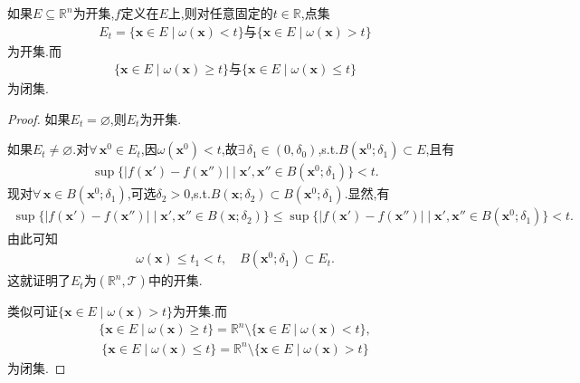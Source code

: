 \documentclass[../../main.tex]{subfiles}%
\begin{document}
\begin{theorem}\label{theorem:振幅函数的定义和性质}
如果$E\subseteq\mathbb{R}^n$为开集,$f$定义在$E$上,则对任意固定的$t\in\mathbb{R}$,点集
\begin{align*}
E_t=\{\boldsymbol{x}\in E\mid \omega(\boldsymbol{x})<t\}\text{与}\{\boldsymbol{x}\in E\mid \omega(\boldsymbol{x})>t\}
\end{align*}
为开集.而
\begin{align*}
\{\boldsymbol{x}\in E\mid \omega(\boldsymbol{x})\geqslant t\}\text{与}\{\boldsymbol{x}\in E\mid \omega(\boldsymbol{x})\leqslant t\}
\end{align*}
为闭集.
\end{theorem}
\begin{proof}

如果$E_t=\varnothing$,则$E_t$为开集.

如果$E_t\neq\varnothing$.对$\forall\,\boldsymbol{x}^0\in E_t$,因$\omega(\boldsymbol{x}^0)<t$,故$\exists\,\delta_1\in(0,\delta_0)$,s.t.$B(\boldsymbol{x}^0;\delta_1)\subset E$,且有
\begin{align*}
\sup\{|f(\boldsymbol{x}')-f(\boldsymbol{x}'')|\mid \boldsymbol{x}',\boldsymbol{x}''\in B(\boldsymbol{x}^0;\delta_1)\}<t.
\end{align*}
现对$\forall\,\boldsymbol{x}\in B(\boldsymbol{x}^0;\delta_1)$,可选$\delta_2>0$,s.t.$B(\boldsymbol{x};\delta_2)\subset B(\boldsymbol{x}^0;\delta_1)$.显然,有
\begin{align*}
\sup\{|f(\boldsymbol{x}')-f(\boldsymbol{x}'')|\mid \boldsymbol{x}',\boldsymbol{x}''\in B(\boldsymbol{x};\delta_2)\}\leqslant \sup\{|f(\boldsymbol{x}')-f(\boldsymbol{x}'')|\mid \boldsymbol{x}',\boldsymbol{x}''\in B(\boldsymbol{x}^0;\delta_1)\}<t.
\end{align*}
由此可知
\begin{align*}
\omega(\boldsymbol{x})\leqslant t_1<t,\quad B(\boldsymbol{x}^0;\delta_1)\subset E_t.
\end{align*}
这就证明了$E_t$为$(\mathbb{R}^n,\mathscr{T})$中的开集.

类似可证$\{\boldsymbol{x}\in E\mid \omega(\boldsymbol{x})>t\}$为开集.而
\begin{align*}
\{\boldsymbol{x}\in E\mid \omega(\boldsymbol{x})\geqslant t\}=\mathbb{R}^n\setminus\{\boldsymbol{x}\in E\mid \omega(\boldsymbol{x})<t\},
\end{align*}
\begin{align*}
\{\boldsymbol{x}\in E\mid \omega(\boldsymbol{x})\leqslant t\}=\mathbb{R}^n\setminus\{\boldsymbol{x}\in E\mid \omega(\boldsymbol{x})>t\}
\end{align*}
为闭集.
\end{proof}
\end{document}
